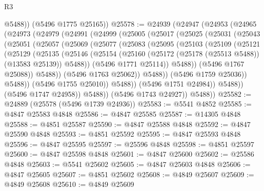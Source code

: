 \begin{lexlean}{R3}
\begin{coremodule}
          @5488))
      (@5496 @1775 @25165))
@25578 := @24939
    (@24947
      (@24953
        (@24965
          (@24973
            (@24979
              (@24991
                (@24999
                  (@25005
                    (@25017
                      (@25025
                        (@25031
                          (@25043
                            (@25051
                              (@25057
                                (@25069
                                  (@25077
                                    (@25083
                                      (@25095
                                        (@25103
                                          (@25109
                                            (@25121
                                              (@25129
                                                (@25135
                                                  (@25146
                                                    (@25154
                                                      (@25160
                                                        (@25172
                                                          (@25178 (@25513 @5488))
                                                          (@13583 @25139))
                                                        @5488))
                                                    (@5496 @1771 @25114))
                                                  @5488))
                                              (@5496 @1767 @25088))
                                            @5488))
                                        (@5496 @1763 @25062))
                                      @5488))
                                  (@5496 @1759 @25036))
                                @5488))
                            (@5496 @1755 @25010))
                          @5488))
                      (@5496 @1751 @24984))
                    @5488))
                (@5496 @1747 @24958))
              @5488))
          (@5496 @1743 @24927))
        @5488))
@25582 := @24889 (@25578 (@5496 @1739 @24936))
@25583 := @5541 @4852
@25585 := @4847 @25583 @4848
@25586 := @4847 @25585
@25587 := @14305 @4848
@25588 := @4851 @25587
@25590 := @4847 @25588 @4848
@25592 := @4847 @25590 @4848
@25593 := @4851 @25592
@25595 := @4847 @25593 @4848
@25596 := @4847 @25595
@25597 := @25596 @4848
@25598 := @4851 @25597
@25600 := @4847 @25598 @4848
@25601 := @4847 @25600
@25602 := @25586 @4848
@25603 := @5541 @25602
@25605 := @4847 @25603 @4848
@25606 := @4847 @25605
@25607 := @4851 @25602
@25608 := @4849 @25607
@25609 := @4849 @25608
@25610 := @4849 @25609

\end{coremodule}
\end{lexlean}
